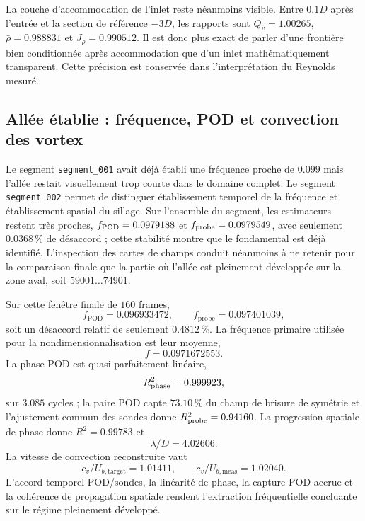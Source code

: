 \documentclass[11pt,a4paper]{article}
\begin{document}
La couche d'accommodation de l'inlet reste néanmoins visible. Entre $0.1D$ après l'entrée et la section de référence $-3D$, les rapports sont $Q_v=1.00265$, $\bar\rho=0.988831$ et $J_\rho=0.990512$. Il est donc plus exact de parler d'une frontière bien conditionnée après accommodation que d'un inlet mathématiquement transparent. Cette précision est conservée dans l'interprétation du Reynolds mesuré.

\subsection{Allée établie : fréquence, POD et convection des vortex}

Le segment \texttt{segment\_001} avait déjà établi une fréquence proche de $0.099$ mais l'allée restait visuellement trop courte dans le domaine complet. Le segment \texttt{segment\_002} permet de distinguer établissement temporel de la fréquence et établissement spatial du sillage. Sur l'ensemble du segment, les estimateurs restent très proches, $f_{\rm POD}=0.0979188$ et $f_{\rm probe}=0.0979549$, avec seulement $0.0368\,\%$ de désaccord ; cette stabilité montre que le fondamental est déjà identifié. L'inspection des cartes de champs conduit néanmoins à ne retenir pour la comparaison finale que la partie où l'allée est pleinement développée sur la zone aval, soit $59001\ldots74901$.

Sur cette fenêtre finale de $160$ frames,
\begin{equation}
 f_{\mathrm{POD}}=0.096933472,\qquad
 f_{\mathrm{probe}}=0.097401039,
\end{equation}
soit un désaccord relatif de seulement $0.4812\,\%$. La fréquence primaire utilisée pour la nondimensionnalisation est leur moyenne,
\begin{equation}
 f=0.0971672553.
 \label{eq:x8-full-fprimary}
\end{equation}
La phase POD est quasi parfaitement linéaire,
\begin{equation}
 R^2_{\rm phase}=0.999923,
\end{equation}
sur $3.085$ cycles ; la paire POD capte $73.10\,\%$ du champ de brisure de symétrie et l'ajustement commun des sondes donne $R^2_{\rm probe}=0.94160$. La progression spatiale de phase donne $R^2=0.99783$ et
\begin{equation}
 \lambda/D=4.02606.
\end{equation}
La vitesse de convection reconstruite vaut
\begin{equation}
 c_v/U_{b,\mathrm{target}}=1.01411,
 \qquad
 c_v/U_{b,\mathrm{meas}}=1.02040.
\end{equation}
L'accord temporel POD/sondes, la linéarité de phase, la capture POD accrue et la cohérence de propagation spatiale rendent l'extraction fréquentielle concluante sur le régime pleinement développé.
\end{document}
